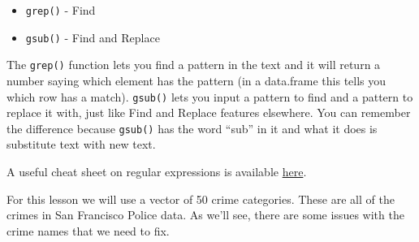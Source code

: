 \documentclass[
  12pt,
  openany]{book}
\providecommand{\tightlist}{%
  \setlength{\itemsep}{0pt}\setlength{\parskip}{0pt}}
\begin{document}
\begin{itemize}
\tightlist
\item
  \texttt{grep()} - Find
\item
  \texttt{gsub()} - Find and Replace
\end{itemize}

The \texttt{grep()} function lets you find a pattern in the text and it will return a number saying which element has the pattern (in a data.frame this tells you which row has a match). \texttt{gsub()} lets you input a pattern to find and a pattern to replace it with, just like Find and Replace features elsewhere. You can remember the difference because \texttt{gsub()} has the word ``sub'' in it and what it does is substitute text with new text.

A useful cheat sheet on regular expressions is available \href{https://www.rstudio.com/wp-content/uploads/2016/09/RegExCheatsheet.pdf}{here}.

For this lesson we will use a vector of 50 crime categories. These are all of the crimes in San Francisco Police data. As we'll see, there are some issues with the crime names that we need to fix.
\end{document}
